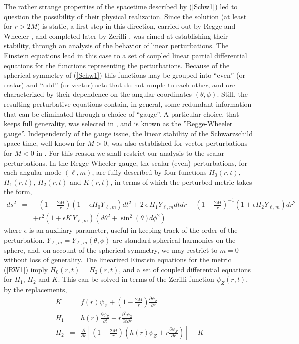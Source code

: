 \documentclass[12pt,aps,floats,showpacs,amssymb,tightenlines]{revtex4}
\newcommand{\e}{\epsilon}
\begin{document}
The rather strange properties of the spacetime described by
(\ref{Schw1}) led to question the possibility of their physical
realization. Since the solution (at least for $r>2M$) is static, a
first step in this direction, carried out by Regge and Wheeler \cite{RW}, and
completed later by Zerilli \cite{Zerilli}, was aimed at establishing their
stability, through an analysis of the behavior of linear
perturbations. The Einstein equations lead in this case to a set of
coupled linear partial differential equations for the functions
representing the perturbations. Because of the spherical symmetry of
(\ref{Schw1}) this functions may be grouped into ``even'' (or
scalar) and ``odd'' (or vector) sets that do not couple to each
other, and are characterized by their dependence on the angular
coordinates $(\theta,\phi)$. Still, the resulting perturbative
equations contain, in general, some redundant information that can
be eliminated through a choice of ``gauge''.
A particular choice, that keeps full generality, was selected in
\cite{RW}, \cite{Zerilli} and is known as the ''Regge-Wheeler gauge''. Independently of the gauge issue, the linear stability of the Schwarzschild space time, well known for $M>0$, was also established for vector perturbations for $M<0$ in \cite{ghi}. For this reason we shall restrict our analysis to the scalar
perturbations.  In the Regge-Wheeler gauge, the scalar (even)
perturbations, for each angular mode $(\ell,m)$,  are fully
described by  four functions $H_0(r,t)$, $H_1(r,t)$, $H_2(r,t)$ and
$K(r,t)$, in terms of which the perturbed metric takes the form,
\begin{eqnarray}
\label{RW1}
ds^2 & = & -\left(1-\frac{2M}{r}\right)\left(1- \e H_0 Y_{\ell,m}\right)dt^2 +
2 \: \e \;  H_1 Y_{\ell,m} dt dr+\left(1-\frac{2M}{r}\right)^{-1}\left(1+ \e H_2 Y_{\ell,m}\right)dr^2
\nonumber \\
& & +r^2\left(1+ \e K\, Y_{\ell,m}\right) \left( d \theta^2 +  \sin^2(\theta)
d \phi^2 \right)
\end{eqnarray}
where $\epsilon$ is an auxiliary parameter, useful in keeping track of the order of the perturbation.
$Y_{\ell,m}=  Y_{\ell,m}(\theta,\phi)$ are standard spherical
harmonics on the sphere, and, on account of the spherical symmetry, we may restrict to $m=0$ without loss of generality. The linearized Einstein equations for the
metric (\ref{RW1}) imply $H_0(r,t)=H_2(r,t)$, and a set of coupled
differential equations for $H_1$, $H_2$ and $K$. This can be solved
in terms of the Zerilli function $\psi_Z(r,t)$, by the replacements,
\begin{eqnarray}
\label{RW2}
K & = & f(r) \psi_Z+\left(1-\frac{2M}{r}\right)\frac{\partial \psi_Z}{\partial r} \nonumber \\
H_1 & = & h(r)\frac{\partial \psi_Z}{\partial t}+r\frac{\partial^2 \psi_Z}{\partial t \partial r}
 \nonumber \\
H_2 & = & \frac{\partial }{\partial r}\left[\left(1-\frac{2M}{r}\right)\left(h(r) \psi_Z
+r\frac{\partial \psi_Z}{ \partial r} \right)\right] -K
\end{eqnarray}
\end{document}
